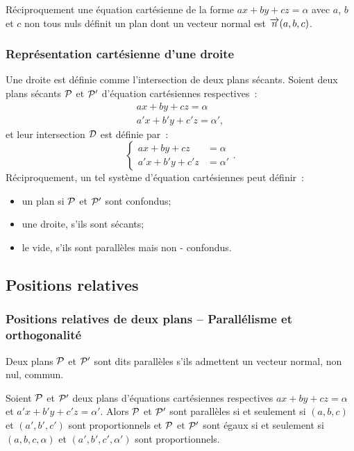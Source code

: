 Réciproquement une équation cartésienne de la forme \(ax + by + cz = \alpha\) 
avec \(a\), \(b\) et \(c\) non tous nuls définit un plan dont un vecteur normal 
est \(\vect{n}(a, b, c)\).

\subsubsection{Représentation cartésienne d'une droite}

Une droite est définie comme l'intersection de deux plans sécants. Soient deux 
plans sécants \(\P\) et \(\P'\) d'équation cartésiennes respectives~:
\begin{align}
  ax + by + cz = \alpha \\ a'x + b'y + c'z = \alpha',
\end{align}
et leur intersection \(\Dr\) est définie par~:
\begin{equation}
  \begin{cases}
    ax + by + cz & = \alpha \\
    a'x + b'y + c'z&=\alpha'
  \end{cases}.
\end{equation}
Réciproquement, un tel système d'équation cartésiennes peut définir~:
\begin{itemize}
  \item un plan si \(\P\) et \(\P'\) sont confondus;
  \item une droite, s'ils sont sécants;
  \item le vide, s'ils sont parallèles mais non - confondus.
\end{itemize}

\subsection{Positions relatives}

\subsubsection{Positions relatives de deux plans -- Parallélisme et 
orthogonalité}

\begin{defdef}
  Deux plans \(\P\) et \(\P'\) sont dits parallèles s'ils admettent un vecteur 
  normal, non nul, commun.
\end{defdef}

\begin{prop}
  Soient \(\P\) et \(\P'\) deux plans d'équations cartésiennes respectives \(ax 
  + by + cz = \alpha\) et \(a'x + b'y + c'z = \alpha'\). Alors \(\P\) et \(\P'\) 
  sont parallèles si et seulement si \((a, b, c)\) et \((a', b', c')\) sont 
  proportionnels et \(\P\) et \(\P'\) sont égaux si et seulement si \((a, b, c, 
  \alpha)\) et \((a', b', c', \alpha')\) sont proportionnels.
\end{prop}

